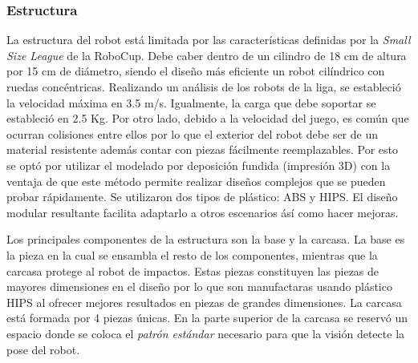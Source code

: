 \documentclass[twocolumn,10pt]{amrob}
\begin{document}
\subsubsection*{Estructura} La estructura del robot está limitada por las características definidas por la \textit{Small Size League} de la RoboCup. Debe caber dentro de un cilindro de 18 cm de altura por 15 cm de diámetro, siendo el diseño más eficiente un robot cilíndrico con ruedas concéntricas.
Realizando un análisis de los robots de la liga, se estableció la velocidad máxima en 3.5 m/s. Igualmente, la carga que debe soportar se estableció en 2.5 Kg. Por otro lado, debido a la velocidad del juego, es común que ocurran colisiones entre ellos por lo que el exterior del robot debe ser de un material resistente además contar con piezas fácilmente reemplazables. Por esto se optó por utilizar el modelado por deposición fundida (impresión 3D) con la ventaja de que este método permite realizar diseños complejos que se pueden probar rápidamente. Se utilizaron dos tipos de plástico: ABS y HIPS. El diseño modular resultante facilita adaptarlo a otros escenarios ásí como hacer mejoras. 

Los principales componentes de la estructura son la base y la carcasa. La base es la pieza en la cual se ensambla el resto de los componentes, mientras que la carcasa protege al robot de impactos. Estas piezas constituyen las piezas de mayores dimensiones en el diseño por lo que son manufactaras usando plástico HIPS al ofrecer mejores resultados en piezas de grandes dimensiones. La carcasa est\'a formada por 4 piezas \'unicas. En la parte superior de la carcasa se reservó un espacio donde se coloca el \textit{patrón estándar} necesario para que la visi\'on detecte la pose del robot.
\end{document}

